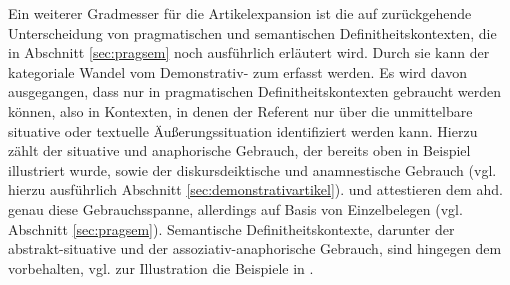 Ein weiterer Gradmesser für die Artikelexpansion  ist die auf \textcite{Lobner1985,Lobner1998} zurückgehende Unterscheidung   von pragmatischen  und semantischen   Definitheitskontexten,  die in Abschnitt \ref{sec:pragsem} noch ausführlich erläutert wird. Durch sie kann der kategoriale Wandel vom Demonstrativ-  zum  erfasst werden. Es wird davon ausgegangen, dass  nur in pragmatischen Definitheitskontexten  gebraucht werden können, also in Kontexten, in denen der Referent nur über die unmittelbare situative oder textuelle Äußerungssituation identifiziert werden kann. Hierzu zählt der situative  und anaphorische  Gebrauch, der bereits oben in Beispiel  illustriert wurde, sowie der diskursdeiktische  und anamnestische  Gebrauch (vgl. hierzu ausführlich Abschnitt \ref{sec:demonstrativartikel}). \textcite[84--88]{Philippi1997} und \textcite[112--117]{Demske2001} attestieren dem ahd.  genau diese Gebrauchsspanne, allerdings auf Basis von Einzelbelegen (vgl. Abschnitt \ref{sec:pragsem}). Semantische Definitheitskontexte, darunter der abstrakt-situative  und der assoziativ-anaphorische  Gebrauch, sind hingegen dem  vorbehalten, vgl. zur Illustration die Beispiele in .\largerpage[2]

